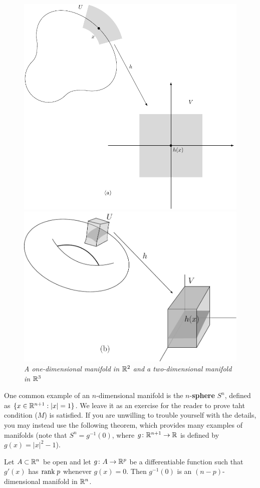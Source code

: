 \begin{figure}[!htb]
    \centering
    \includegraphics[width=.75\linewidth]{./pics/Fig5-1-(a).pdf}
    
    \includegraphics[width=.75\linewidth]{./pics/Fig5-1-(b).pdf}
    \caption{\textit{A one-dimensional manifold in $\mathbb{R}^2$ and a two-dimensional manifold in $\mathbb{R}^3$}}
    \label{Fig 5-1}
\end{figure}

One common example of an $n$-dimensional manifold is the $n$-\textbf{sphere}
$S^n$, defined as $\{x\in\mathbb{R}^{n+1}:|x|=1\}$. We leave it as an exercise for 
the reader to prove taht condition ($M$) is satisfied. If you are unwilling 
to trouble yourself with the details, you may instead use the following theorem,
which provides many examples of manifolds (note that $S^n=g^{-1}(0)$, where $g\colon{}\mathbb{R}^{n+1}\to\mathbb{R}$
is defined by $g(x)=|x|^2-1$).

\begin{theorem}
    Let $A\subset \mathbb{R}^n$ be open and let $g\colon{}A\to\mathbb{R}^p$ be a differentiable
    function such that $g'(x)$ has $\mathrm{rank}\; p$ whenever $g(x)=0$. Then $g^{-1}(0)$
    is an $(n-p)$-dimensional manifold in $\mathbb{R}^n$.
\end{theorem}

